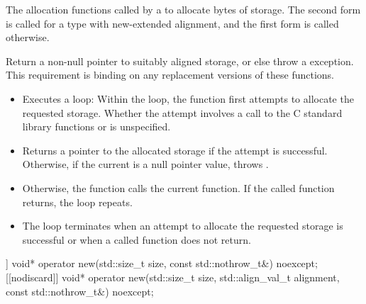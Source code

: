 \begin{itemdescr}
\pnum
\effects
The
allocation functions
called by a
to allocate
 bytes of storage.
The second form is called for a type with new-extended alignment, and
the first form is called otherwise.

\pnum
\replaceable
{}

\pnum
\required
Return a non-null pointer to suitably aligned storage,
or else throw a
%
exception.
This requirement is binding on any replacement versions of these functions.

\pnum
{}

\begin{itemize}
\item
Executes a loop:
Within the loop, the function first attempts to allocate the requested storage.
Whether the attempt involves a call to the C standard library functions
 or 
is unspecified.
%
\item
Returns a pointer to the allocated storage if the attempt is successful.
Otherwise, if the
current  is
a null pointer value, throws
.
\item
Otherwise, the function calls the current
 function.
If the called function returns, the loop repeats.
\item
The loop terminates when an attempt to allocate the requested storage is
successful or when a called
function does not return.
\end{itemize}
\end{itemdescr}

%
\begin{itemdecl}
[[nodiscard]] void* operator new(std::size_t size, const std::nothrow_t&) noexcept;
[[nodiscard]] void* operator new(std::size_t size, std::align_val_t alignment,
                                 const std::nothrow_t&) noexcept;
\end{itemdecl}

